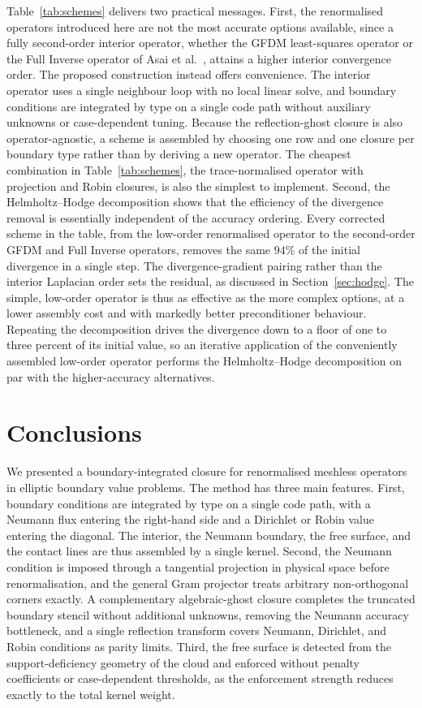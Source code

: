 \documentclass[preprint,review,12pt]{elsarticle}
\begin{document}
Table~\ref{tab:schemes} delivers two practical messages.
First, the renormalised operators introduced here are not the most accurate options available, since a fully second-order interior operator, whether the GFDM least-squares operator or the Full Inverse operator of Asai et al.~\cite{Asai2023}, attains a higher interior convergence order.
The proposed construction instead offers convenience.
The interior operator uses a single neighbour loop with no local linear solve, and boundary conditions are integrated by type on a single code path without auxiliary unknowns or case-dependent tuning.
Because the reflection-ghost closure is also operator-agnostic, a scheme is assembled by choosing one row and one closure per boundary type rather than by deriving a new operator.
The cheapest combination in Table~\ref{tab:schemes}, the trace-normalised operator with projection and Robin closures, is also the simplest to implement.
Second, the Helmholtz--Hodge decomposition shows that the efficiency of the divergence removal is essentially independent of the accuracy ordering.
Every corrected scheme in the table, from the low-order renormalised operator to the second-order GFDM and Full Inverse operators, removes the same $94\%$ of the initial divergence in a single step.
The divergence-gradient pairing rather than the interior Laplacian order sets the residual, as discussed in Section~\ref{sec:hodge}.
The simple, low-order operator is thus as effective as the more complex options, at a lower assembly cost and with markedly better preconditioner behaviour.
Repeating the decomposition drives the divergence down to a floor of one to three percent of its initial value, so an iterative application of the conveniently assembled low-order operator performs the Helmholtz--Hodge decomposition on par with the higher-accuracy alternatives.

\section{Conclusions}
\label{sec:concl}

We presented a boundary-integrated closure for renormalised meshless operators in elliptic boundary value problems.
The method has three main features.
First, boundary conditions are integrated by type on a single code path, with a Neumann flux entering the right-hand side and a Dirichlet or Robin value entering the diagonal.
The interior, the Neumann boundary, the free surface, and the contact lines are thus assembled by a single kernel.
Second, the Neumann condition is imposed through a tangential projection in physical space before renormalisation, and the general Gram projector treats arbitrary non-orthogonal corners exactly.
A complementary algebraic-ghost closure completes the truncated boundary stencil without additional unknowns, removing the Neumann accuracy bottleneck, and a single reflection transform covers Neumann, Dirichlet, and Robin conditions as parity limits.
Third, the free surface is detected from the support-deficiency geometry of the cloud and enforced without penalty coefficients or case-dependent thresholds, as the enforcement strength reduces exactly to the total kernel weight.
\end{document}
